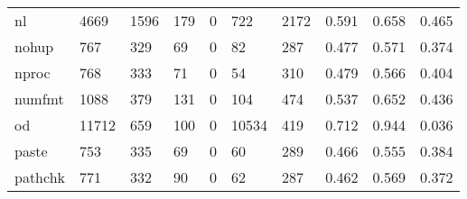 \begin{longtable}{lp{2.0cm}p{2.0cm}p{2.0cm}p{2.0cm}p{2.0cm}p{2.0cm}p{2.0cm}p{2.0cm}p{2.0cm}}
nl        &                   4669 &                               1596 &                               179 &                                0 &                               722 &                            2172 &                                0.591 &                                  0.658 &                                0.465 \\
nohup     &                    767 &                                329 &                                69 &                                0 &                                82 &                             287 &                                0.477 &                                  0.571 &                                0.374 \\
nproc     &                    768 &                                333 &                                71 &                                0 &                                54 &                             310 &                                0.479 &                                  0.566 &                                0.404 \\
numfmt    &                   1088 &                                379 &                               131 &                                0 &                               104 &                             474 &                                0.537 &                                  0.652 &                                0.436 \\
od        &                  11712 &                                659 &                               100 &                                0 &                             10534 &                             419 &                                0.712 &                                  0.944 &                                0.036 \\
paste     &                    753 &                                335 &                                69 &                                0 &                                60 &                             289 &                                0.466 &                                  0.555 &                                0.384 \\
pathchk   &                    771 &                                332 &                                90 &                                0 &                                62 &                             287 &                                0.462 &                                  0.569 &                                0.372 \\

\end{longtable}
